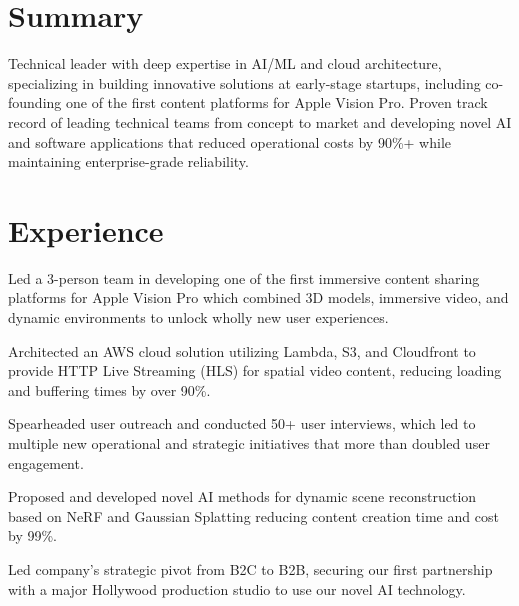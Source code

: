 \documentclass[]{deedy-resume-openfont}
\begin{document}
%
%
\lastupdated

%
%


\section{Summary}

{\justifying
{
\large Technical leader with deep expertise in AI/ML and cloud architecture, specializing in building innovative solutions at early-stage startups, including co-founding one of the first content platforms for Apple Vision Pro. Proven track record of leading technical teams from concept to market and developing novel AI and software applications that reduced operational costs by 90\%+ while maintaining enterprise-grade reliability.}
\par}

\section{Experience}
\hfill {}
\begin{tightemize}
    \item Led a 3-person team in developing one of the first immersive content sharing platforms for Apple Vision Pro which combined 3D models, immersive video, and dynamic environments to unlock wholly new user experiences.
    \item Architected an AWS cloud solution utilizing Lambda, S3, and Cloudfront to provide HTTP Live Streaming (HLS) for spatial video content, reducing loading and buffering times by over 90\%.
    \item Spearheaded user outreach and conducted 50+ user interviews, which led to multiple new operational and strategic initiatives that more than doubled user engagement.
    \item Proposed and developed novel AI methods for dynamic scene reconstruction based on NeRF and Gaussian Splatting reducing content creation time and cost by 99\%.
    \item Led company's strategic pivot from B2C to B2B, securing our first partnership with a major Hollywood production studio to use our novel AI technology.
    \end{tightemize}
\end{document}
